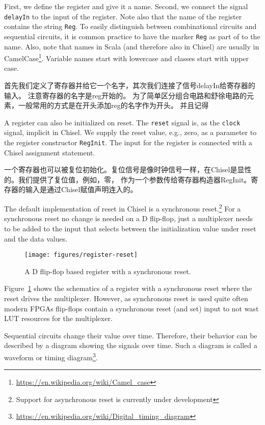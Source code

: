 \documentclass[%
    10pt,
    headinclude, footexclude,
    openright, %
    notitlepage,
    cleardoubleempty,
    headsepline,
    pointlessnumbers,
    bibtotoc, idxtotoc,
    ]{scrbook}
\newcommand{\code}[1]{{\small{\texttt{#1}}}}
\newcommand{\scale}{0.7}
\newcommand{\myref}[2]{\href{#1}{#2}}
\renewcommand{\myref}[2]{{#2}{\footnote{\url{#1}}}}
\begin{document}
First, we define the register and give it a name. Second, we connect the signal
\code{delayIn} to the input of the register. Note also that the name of the register
contains the string \code{Reg}. To easily distinguish between combinational
circuits and sequential circuits, it is common practice to have the marker
\code{Reg} as part of to the name. Also, note that names in Scala (and therefore
also in Chisel) are usually in
\myref{https://en.wikipedia.org/wiki/Camel_case}{CamelCase}.
Variable names start with lowercase and classes start with upper case.

首先我们定义了寄存器并给它一个名字，其次我们连接了信号delayIn给寄存器的输入。
注意寄存器的名字是reg开始的。
为了简单区分组合电路和舒徐电路的元素，一般常用的方式是在开头添加reg的名字作为开头。
并且记得


A register can also be initialized on reset. The \code{reset} signal is, as the \code{clock} signal,
implicit in Chisel. We supply the reset value, e.g., zero, as a parameter to the register
constructor \code{RegInit}. The input for the register is connected with a Chisel
assignment statement.

一个寄存器也可以被复位初始化。复位信号是像时钟信号一样，在Chisel是显性的。我们提供了复位值，例如，零，
作为一个参数传给寄存器构造器RegInit。寄存器的输入是通过Chisel赋值声明连入的。


The default implementation of reset in Chisel is a synchronous
reset.\footnote{Support for asynchronous reset is currently under development}
For a synchronous reset no change is needed on a D flip-flop, just a multiplexer
needs to be added to the input that selects between the initialization value under
reset and the data values.


\begin{figure}
  \centering
  \texttt{[image: figures/register-reset]}
  \caption{A D flip-flop based register with a synchronous reset.}
  \label{fig:register-reset}
\end{figure}

Figure~\ref{fig:register-reset} shows the schematics of a register with a synchronous reset
where the reset drives the multiplexer. However, as synchronous reset is used quite often
modern FPGAs flip-flops contain a synchronous reset (and set) input to not wast LUT
resources for the multiplexer.

Sequential circuits change their value over time. Therefore, their behavior can be described
by a diagram showing the signals over time. Such a diagram is called a waveform or
\myref{https://en.wikipedia.org/wiki/Digital_timing_diagram}{timing diagram}.
\end{document}
